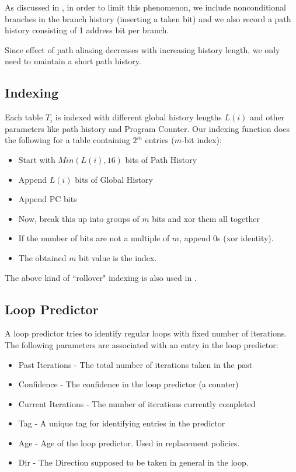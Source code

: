 \documentclass{sig-alternate}
\begin{document}
As discussed in \cite{ogehl}, in order to limit this phenomenon,
we include nonconditional branches in the branch history (inserting
a taken bit) and we also record a path history consisting
of 1 address bit per branch.

Since effect of path aliasing decreases with increasing history length,
we only need to maintain a short path history.

\subsection{Indexing}

Each table $T_i$ is indexed with different global history lengths $L(i)$ and
other parameters like path history and Program Counter. Our indexing function
does the following for a table containing $2^m$ entries ($m$-bit index):
\begin{itemize}
  \item Start with $Min(L(i), 16)$ bits of Path History
  \item Append $L(i)$ bits of Global History
  \item Append PC bits
  \item Now, break this up into groups of $m$ bits and xor them all together
  \item If the number of bits are not a multiple of $m$, append $0$s (xor identity).
  \item The obtained $m$ bit value is the index.
\end{itemize}

The above kind of ``rollover" indexing is also used in \cite{cbp1.5}.

\subsection{Loop Predictor}

A loop predictor tries to identify regular loops with fixed number of iterations.
The following parameters are associated with an entry in the loop predictor:
\begin{itemize}
  \item Past Iterations - The total number of iterations taken in the past
  \item Confidence - The confidence in the loop predictor (a counter)
  \item Current Iterations - The number of iterations currently completed
  \item Tag - A unique tag for identifying entries in the predictor
  \item Age - Age of the loop predictor. Used in replacement policies.
  \item Dir - The Direction supposed to be taken in general in the loop.
\end{itemize}
\end{document}
